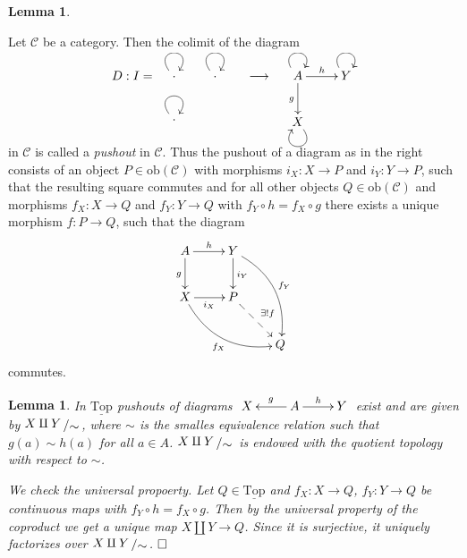 \documentclass[11pt]{book}
\numberwithin{dummy}{section}
\newtheorem{lemma}[theorem]{Lemma}
\theoremstyle{nonumberbreak}
\newenvironment{pr}[1][]{\ifthenelse{\equal{#1}{}}{\proof}{\proof[#1]}\rm}{\endproof}
\newenvironment{ex}[1][]{\ifthenelse{\equal{#1}{}}{\example}{\example[#1]}\rm}{\endexample}
\newcommand{\topsp}{\underline{\mathrm{Top}}}
\newcommand{\C}{\mathcal{C}}
\newcommand{\obc}{\mathrm{ob}(\mathcal{C})}
\newcommand{\la}{\longrightarrow}
\newcommand{\slant}[2]{{\raisebox{.1em}{$#1$}\left/\raisebox{-.1em}{$#2$}\right.}}
\begin{document}
\begin{spacing}{1.4}
\begin{lemma}
\begin{pr}
\end{pr}


\end{lemma}


\begin{ex}
Let $\C$ be a category. Then the colimit of the diagram

$$D: I= \quad \begin{xy} \xymatrix{ \cdot \ar@(ul,ur) & \cdot \ar@(ul,ur) \\ \cdot \ar@(ul,ur) & }\end{xy} \qquad \la \quad \begin{xy}\xymatrix{  A\ar@(ul,ur) \ar[d]_{g} \ar[r]^{h} & Y \ar@(ul,ur)  \\ X \ar@(dr,dl) & }\end{xy}$$
 
 in $\C$ is called a \textit{pushout} in $\C$. Thus the pushout of a diagram as in the right consists of an object $P \in \obc$ with morphisms $i_X: X \la P$ and $i_Y: Y \la P$, such that the resulting square commutes and for all other objects $Q \in \obc$ and morphisms $f_X: X \la Q$ and $f_Y: Y \la Q$ with $f_Y \circ h = f_X \circ g$ there exists a unique morphism $f: P \la Q$, such that the diagram
 $$
 \begin{xy}
 \xymatrix{
 A \ar[r]^{h} \ar[d]_{g} & Y \ar[d]^{i_Y} \ar@/^{16pt}/[rdd]^{f_Y} & \\ X \ar[r]_{i_X} \ar@/_{16pt}/[rrd]_{f_X} & P \ar@{-->}[rd]^{\exists ! f} & \\ && Q
 }
 \end{xy}
 $$
 commutes.


\end{ex}


\begin{lemma}
In $\topsp$ pushouts of diagrams $\begin{xy}\xymatrix{ X & A \ar[l]_{g} \ar[r]^{h} & Y}\end{xy}$ exist and are given by $\slant{X \amalg Y}{\sim}$, where $\sim$ is the smalles equivalence relation such that $g(a) \sim h(a)$ for all $a \in A$. $\slant{X \amalg Y}{\sim}$ is endowed with the quotient topology with respect to $\sim$.

\begin{pr}
We check the universal propoerty. Let $Q \in \topsp$ and $f_X: X \la Q$, $f_Y: Y \la Q$ be continuous maps with $f_Y \circ h = f_X \circ g$. Then by the universal property of the coproduct we get a unique map $X \amalg Y \la Q$. Since it is surjective, it uniquely factorizes over $\slant{X \amalg Y}{\sim}$. $\hfill \Box$


\end{pr}
\end{lemma}
\end{spacing}
\end{document}

